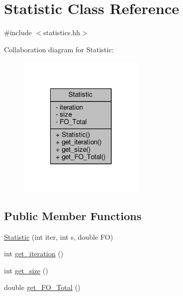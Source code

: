 \hypertarget{classStatistic}{\section{Statistic Class Reference}
\label{classStatistic}
}


{\ttfamily \#include $<$statistics.\-hh$>$}



Collaboration diagram for Statistic\-:\nopagebreak
\begin{figure}[H]
\begin{center}
\leavevmode
\includegraphics[width=170pt]{classStatistic__coll__graph}
\end{center}
\end{figure}
\subsection*{Public Member Functions}
\begin{DoxyCompactItemize}
\item 
\hyperlink{classStatistic_a26751917fec693e54f53ddd82bdcfeb6}{Statistic} (int iter, int s, double F\-O)
\item 
int \hyperlink{classStatistic_aa2c0c56373ccda1863f581eac24413b3}{get\-\_\-iteration} ()
\item 
int \hyperlink{classStatistic_ad28210c1a4d8682ab13780b47d415a6b}{get\-\_\-size} ()
\item 
double \hyperlink{classStatistic_a6a336f89725583229d34ba270af85be0}{get\-\_\-\-F\-O\-\_\-\-Total} ()
\end{DoxyCompactItemize}
